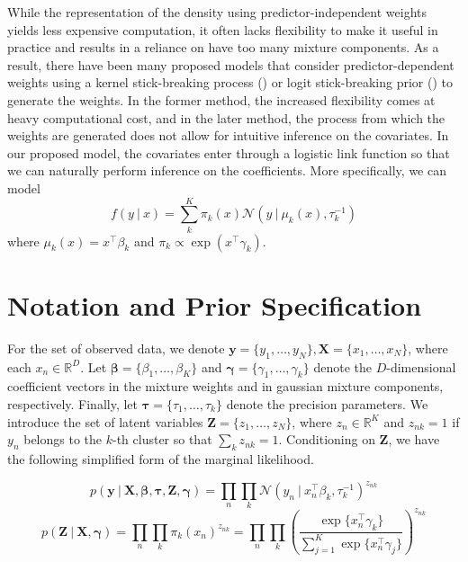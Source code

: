 \documentclass[twoside,11pt]{article}
\newcommand\given[1][]{\:#1\vert\:}
\newcommand{\transpose}[1]{#1^{\intercal}}
\newcommand{\R}{\mathbb{R}}
\newcommand{\nprod}{\prod_{n}}
\newcommand{\kprod}{\prod_{k}}
\newcommand{\boldbeta}{\boldsymbol\beta}
\newcommand{\boldgamma}{\boldsymbol\gamma}
\newcommand{\boldtau}{\boldsymbol\tau}
\newcommand{\sumexp}{\sum_{j=1}^{K} \exp \{ \transpose{x_n} \gamma_j \}}
\begin{document}
While the representation of the density using predictor-independent weights yields less expensive computation, it often lacks flexibility to make it useful in practice and results in a reliance on have too many mixture components. As a result, there have been many proposed models that consider predictor-dependent weights using a kernel stick-breaking process (\cite{dunsonpark:08}) or logit stick-breaking prior (\cite{durante:17}) to generate the weights. In the former method, the increased flexibility comes at heavy computational cost, and in the later method, the process from which the weights are generated does not allow for intuitive inference on the covariates. In our proposed model, the covariates enter through a logistic link function so that we can naturally perform inference on the coefficients. More specifically, we can model
\begin{equation} \label{eq:covdep_gm}
	 f(y \given x) = \sum_{k}^{K} \pi_k(x) \mathcal{N} \left( y \given \mu_k(x), \tau_k^{-1} \right) 
\end{equation} 
where $\mu_k(x) = \transpose{x} \beta_k$ and $\pi_{k} \propto \exp(\transpose{x} \gamma_k)$. 

\section{Notation and Prior Specification}
For the set of observed data, we denote $\mathbf{y} = \{y_1, \ldots, y_N \}, \mathbf{X} = \{ x_1, \ldots, x_N \}$, where each $x_n \in \R^{D}$. Let $\boldbeta = \{ \beta_1, \ldots, \beta_K\}$ and $\boldgamma = \{ \gamma_1, \ldots, \gamma_k\}$ denote the $D$-dimensional coefficient vectors  in the mixture weights and in gaussian mixture components, respectively. Finally, let $\boldtau = \{ \tau_1, \ldots, \tau_k \}$ denote the precision parameters. We introduce the set of latent variables $\mathbf{Z} = \{ z_1, \ldots, z_N \}$, where $z_n \in \R^K$ and $z_{nk} = 1$ if $y_n$ belongs to the $k$-th cluster so that $\sum_{k} z_{nk} = 1$. Conditioning on $\mathbf{Z}$, we have the following simplified form of the marginal likelihood. 


\begin{equation} \label{eq:simp_lik}
	p \left( \mathbf{y} \given \mathbf{X}, \boldsymbol\beta, \boldsymbol{\tau}, \mathbf{Z}, \boldsymbol\gamma \right) = 
	\prod_{n} \prod_{k} \mathcal{N} \left( y_n \given \transpose{x_n} \beta_k, \tau_{k}^{-1} \right)^{z_{nk}}
\end{equation}
\begin{equation} \label{eq:z_prior}
	p \left( \mathbf{Z} \given \mathbf{X}, \boldsymbol\gamma \right) = \nprod \kprod \pi_{k} (x_n)^{z_{nk}} = 
	\nprod \kprod \left( \frac{\exp\{\transpose{x_n} \gamma_k\}}{\sumexp}\right)^{z_{nk}}
\end{equation}
\end{document}
